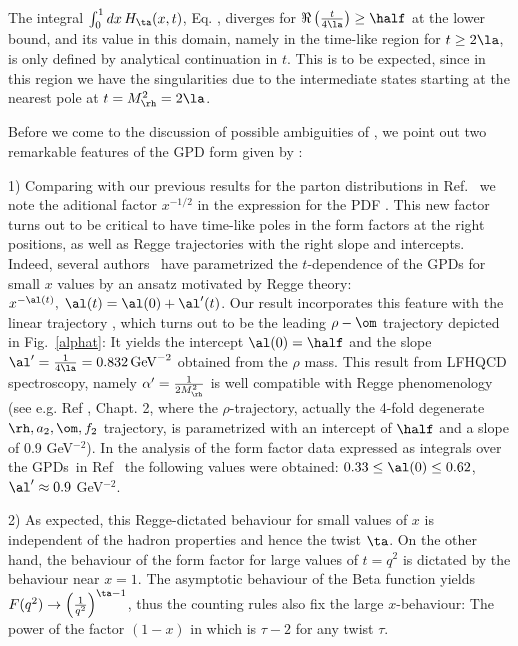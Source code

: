 \documentclass[aps,prd,preprint,groupedaddress]{revtex4-1}
\begin{document}
The integral $ \int_0^1 dx\,  H_\ta(x, t)$, Eq. ,   diverges for $\Re \left(\frac{t}{4 \la}\right) \geq \half $ at the lower bound, and its value  in this domain, namely in the time-like region for $t \ge 2 \la$, is only defined by analytical continuation in $t$. This is to be expected, since in this region  we have the singularities  due to the intermediate states starting at the nearest pole at $t = M_\rh^2 = 2 \la$. 

Before we come to the discussion of possible ambiguities of , we point out  two remarkable features of the GPD form given by :

1) Comparing with our previous results for the parton distributions in Ref.~\cite{Brodsky:2007hb} we note the aditional factor $x^{-1/2}$ in the expression for the PDF . This new factor turns out to be critical to have time-like poles in the form factors at the right positions, as well as Regge trajectories with the right slope and intercepts. Indeed, several authors~\cite{Goeke:2001tz, Diehl:2004cx, Guidal:2004nd, Diehl:2013xca, Selyugin:2009ic} have parametrized the $t$-dependence of the GPDs for small $x$ values by an ansatz motivated by Regge theory: $x^{-\al(t)}, \; \al(t) = \al(0) + \al'(t)$. Our result  incorporates this feature with the linear trajectory , which turns out to be the leading $\rho-\om$ trajectory depicted in Fig.~\ref{alphat}: It yields the  intercept $\al(0) = \half$ and the slope $\al'= \frac{1}{4 \la} =  0.832 \, \mbox{GeV}^{-2}$ obtained from the $\rho$ mass. This result from LFHQCD spectroscopy, namely $\alpha' = \frac{1}{2 M_\rh^2}$ is well compatible with Regge phenomenology (see  e.g. Ref \cite{Donnachie:2002en}, Chapt. 2,  where the $\rho$-trajectory, actually the 4-fold degenerate $\rh, a_2, \om, f_2$ trajectory, is parametrized with an intercept of $\half$ and a slope of 0.9 GeV$^{-2}$).  In the analysis of the form factor data expressed as integrals over the GPDs~in Ref~\cite{Diehl:2013xca} the following values were obtained:
$0.33 \leq \al(0) \leq 0.62$, $\al' \approx 0.9$ GeV$^{-2}$.


2) As expected, this Regge-dictated behaviour for small values of $x$ is independent of the hadron properties and hence the twist $\ta$. On the other hand, the behaviour of the form factor for large values of $t = q^2$ is dictated by the behaviour near $x=1$. The asymptotic behaviour of the Beta function  yields $ F(q^2) \to \left(\frac{1}{q^2}\right)^{\ta-1}$,  thus the counting rules also fix the large $x$-behaviour:  The power of the factor $(1-x)$ in  which is $\tau-2$ for any twist $\tau$.
\end{document}
